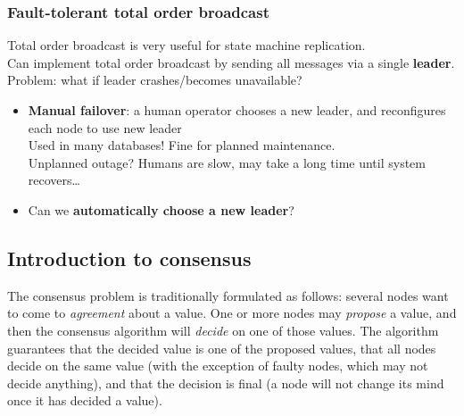 \begin{frame}
    \label{s:failover}
    \frametitle{Fault-tolerant total order broadcast}
    Total order broadcast is very useful for state machine replication.\\[0.5em]
    Can implement total order broadcast by sending all messages via a single \textbf{leader}.\\[0.5em]
    Problem: what if leader crashes/becomes unavailable?\\\pause
    \begin{itemize}
        \item \textbf{Manual failover}: a human operator chooses a new leader, and reconfigures each node to use new leader\\[0.5em]
            Used in many databases! Fine for planned maintenance.\\[0.5em]\pause
            Unplanned outage? Humans are slow, may take a long time until system recovers\dots\\[0.5em]\pause
        \item Can we \textbf{automatically choose a new leader}?
    \end{itemize}
\end{frame}
\label{l:failover}

\subsection{Introduction to consensus}

The consensus problem is traditionally formulated as follows: several nodes want to come to \emph{agreement} about a value.
One or more nodes may \emph{propose} a value, and then the consensus algorithm will \emph{decide} on one of those values.
The algorithm guarantees that the decided value is one of the proposed values, that all nodes decide on the same value (with the exception of faulty nodes, which may not decide anything), and that the decision is final (a node will not change its mind once it has decided a value).


